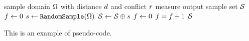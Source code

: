 \begin{algorithm}
  \begin{algorithmic}[1]
    \REQUIRE sample domain $\Omega$ with distance $d$ and conflict $r$ measure
    \ENSURE output sample set $\mathcal{S}{}$
    \STATE $f \leftarrow 0$ 
    \STATE $s{} \leftarrow \texttt{RandomSample}(\Omega)$
    \IF{$\dist(\sample, \sampleprime) < \conflictdist(\sample, \sampleprime) \; \forall \sampleprime \in \sampleset$}
    \STATE $\mathcal{S}{} \leftarrow \mathcal{S}{} \oplus s{}$ 
    \STATE $f \leftarrow 0$
    \ELSE
    \STATE $f = f + 1$
    \ENDIF
    \ENDWHILE
    \RETURN{} $\mathcal{S}{}$
  \end{algorithmic}
  {%
This is an example of pseudo-code.
  }
  \label{alg:dart_throw}
\end{algorithm}


